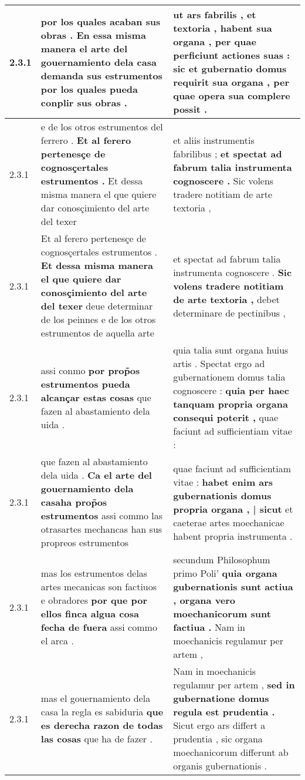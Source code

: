\begin{tabular}{|p{1cm}|p{6.5cm}|p{6.5cm}|}
2.3.1 & por los quales acaban sus obras . \textbf{ En essa misma manera el arte del gouernamiento dela casa demanda sus estrumentos } por los quales pueda conplir sus obras . & ut ars fabrilis , \textbf{ et textoria , habent sua organa , per quae perficiunt actiones suas : sic et gubernatio domus requirit sua organa , } per quae opera sua complere possit . \\\hline
2.3.1 & e de los otros estrumentos del ferrero . \textbf{ Et al ferero pertenesçe de cognosçertales estrumentos . } Et dessa misma manera el que quiere dar conosçimiento del arte del texer & et aliis instrumentis fabrilibus ; \textbf{ et spectat ad fabrum talia instrumenta cognoscere . } Sic volens tradere notitiam de arte textoria , \\\hline
2.3.1 & Et al ferero pertenesçe de cognosçertales estrumentos . \textbf{ Et dessa misma manera el que quiere dar conosçimiento del arte del texer } deue determinar de los peinnes e de los otros estrumentos de aquella arte & et spectat ad fabrum talia instrumenta cognoscere . \textbf{ Sic volens tradere notitiam de arte textoria , } debet determinare de pectinibus , \\\hline
2.3.1 & assi conmo \textbf{ por prop̃os estrumentos pueda alcançar estas cosas } que fazen al abastamiento dela uida . & quia talia sunt organa huius artis . Spectat ergo ad gubernationem domus talia cognoscere : \textbf{ quia per haec tanquam propria organa consequi poterit , } quae faciunt ad sufficientiam vitae : \\\hline
2.3.1 & que fazen al abastamiento dela uida . \textbf{ Ca el arte del gouernamiento dela casaha prop̃os estrumentos } assi commo las otrasartes mechancas han sus propreos estrumentos & quae faciunt ad sufficientiam vitae : \textbf{ habet enim ars gubernationis domus propria organa , | sicut } et caeterae artes moechanicae habent propria instrumenta . \\\hline
2.3.1 & mas los estrumentos delas artes mecanicas son factiuos e obradores \textbf{ por que por ellos finca algua cosa fecha de fuera } assi commo el arca . & secundum Philosophum primo Poli’ \textbf{ quia organa gubernationis sunt actiua , organa vero moechanicorum sunt factiua . } Nam in moechanicis regulamur per artem , \\\hline
2.3.1 & mas el gouernamiento dela casa la regla es sabiduria \textbf{ que es derecha razon de todas las cosas } que ha de fazer . & Nam in moechanicis regulamur per artem , \textbf{ sed in gubernatione domus regula est prudentia . } Sicut ergo ars differt a prudentia , sic organa moechanicorum differunt ab organis gubernationis . \\\hline

\end{tabular}
